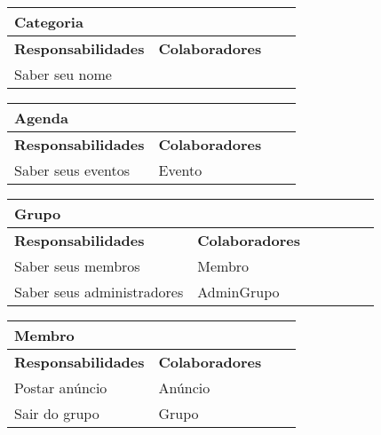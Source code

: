 \documentclass{article}
\begin{document}
    
    \begin{center}
   	 \begin{tabular}{|p{0.5\linewidth}|p{0.5\linewidth}|}
\hline
 	\multicolumn{2}{|p{\textwidth}|}{
{\large \textbf{Categoria}}
}  \\
\hline
\textbf{Responsabilidades} & \textbf{Colaboradores} \\ 
\hline
  	Saber seu nome &  \\
  	\hline
   	\end{tabular} 
    \end{center}
    
    
    \begin{center}
   	 \begin{tabular}{|p{0.5\linewidth}|p{0.5\linewidth}|}
\hline
 	\multicolumn{2}{|p{\textwidth}|}{
{\large \textbf{Agenda}}
}  \\
\hline
\textbf{Responsabilidades} & \textbf{Colaboradores} \\ 
\hline
  	Saber seus eventos & Evento \\
  	\hline
   	\end{tabular} 
    \end{center}
    
    
    \begin{center}
   	 \begin{tabular}{|p{0.5\linewidth}|p{0.5\linewidth}|}
\hline
 	\multicolumn{2}{|p{\textwidth}|}{
{\large \textbf{Grupo}}
}  \\
\hline
\textbf{Responsabilidades} & \textbf{Colaboradores} \\ 
\hline
  	Saber seus membros & Membro \\
  	\hline
  	Saber seus administradores & AdminGrupo \\
  	\hline
   	\end{tabular} 
    \end{center}
    
    
    \begin{center}
   	 \begin{tabular}{|p{0.5\linewidth}|p{0.5\linewidth}|}
\hline
 	\multicolumn{2}{|p{\textwidth}|}{
{\large \textbf{Membro}}
}  \\
\hline
\textbf{Responsabilidades} & \textbf{Colaboradores} \\ 
\hline
  	Postar anúncio & Anúncio \\
  	\hline
  	Sair do grupo & Grupo \\
  	\hline
   	\end{tabular} 
    \end{center}
    
\end{document}
